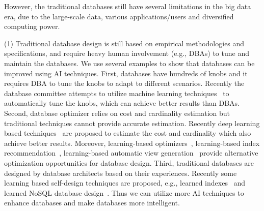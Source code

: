 
However, the traditional databases still have several limitations in the big data era, due to the large-scale data, various applications/users and diversified computing power.

(1) Traditional database design is still based on empirical methodologies and specifications, and require heavy human involvement (e.g., DBAs) to tune and maintain the databases. We use several examples to show that databases can be improved using AI techniques. First, databases have hundreds of knobs and it requires DBA to tune the knobs to adapt to different scenarios. Recently the database committee attempts to utilize machine learning techniques~\cite{DBLP:conf/sigmod/AkenPGZ17, DBLP:conf/vldb/qtune19,  DBLP:conf/sigmod/cdbtune19} to automatically tune the knobs, which can achieve better results than DBAs. Second, database optimizer relies on cost and cardinality estimation but traditional techniques cannot provide accurate estimation. Recently deep learning based techniques~\cite{DBLP:conf/cidr/KipfKRLBK19, DBLP:conf/sigmod/OrtizBGK18} are proposed to estimate the cost and cardinality which also achieve better results. Moreover, learning-based optimizers~\cite{DBLP:journals/corr/abs-1808-03196, DBLP:conf/sigmod/MarcusP18}, learning-based  index recommendation~\cite{DBLP:conf/hais/PedrozoNR18}, learning-based automatic view generation~\cite{DBLP:journals/corr/abs-1903-01363} provide alternative optimization opportunities for database design. Third, traditional databases are designed by database  architects based on their experiences. Recently some learning based self-design techniques are proposed, e.g., learned indexes~\cite{DBLP:conf/sigmod/KraskaBCDP18} and learned NoSQL database design~\cite{DBLP:conf/cidr/IdreosDQAHRLJGL19}. Thus we can utilize more AI techniques to enhance databases and make databases more intelligent.      


